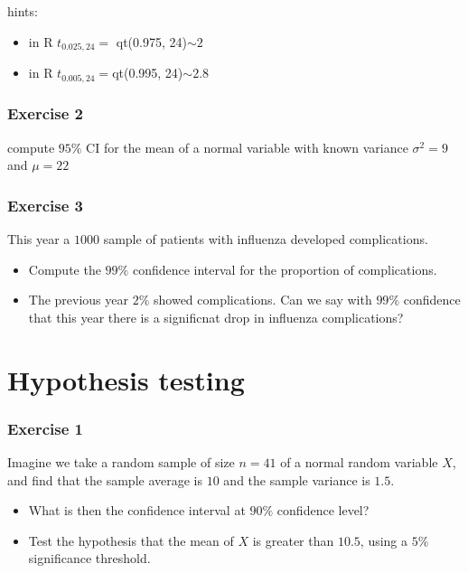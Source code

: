 \documentclass[
]{book}
\begin{document}
hints:

\begin{itemize}
\item
  in R \(t_{0.025, 24}=\) qt(0.975, 24)\(\sim 2\)
\item
  in R \(t_{0.005, 24}=\)qt(0.995, 24)\(\sim 2.8\)
\end{itemize}

\hypertarget{exercise-2-9}{%
\subsubsection{Exercise 2}\label{exercise-2-9}}

compute \(95\%\) CI for the mean of a normal variable with known variance \(\sigma^2=9\) and \(\mu=22\)

\hypertarget{exercise-3-6}{%
\subsubsection{Exercise 3}\label{exercise-3-6}}

This year a \(1000\) sample of patients with influenza developed complications.

\begin{itemize}
\item
  Compute the \(99\%\) confidence interval for the proportion of complications.
\item
  The previous year \(2\%\) showed complications. Can we say with \(99\%\) confidence that this year there is a significnat drop in influenza complications?
\end{itemize}

\hypertarget{hypothesis-testing-7}{%
\section{Hypothesis testing}\label{hypothesis-testing-7}}

\hypertarget{exercise-1-10}{%
\subsubsection{Exercise 1}\label{exercise-1-10}}

Imagine we take a random sample of size \(n = 41\) of a normal random variable \(X\), and find that the sample average is \(10\) and the sample variance is \(1.5\).

\begin{itemize}
\item
  What is then the confidence interval at \(90\%\) confidence level?
\item
  Test the hypothesis that the mean of \(X\) is greater than \(10.5\), using a \(5\%\) significance threshold.
\end{itemize}
\end{document}
